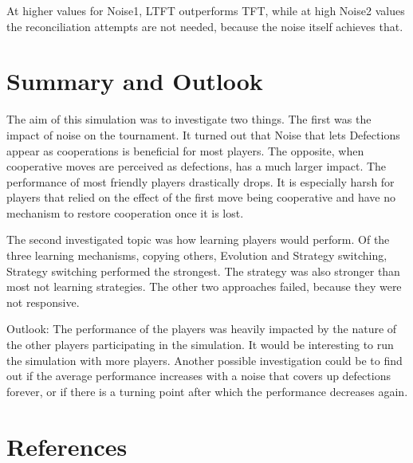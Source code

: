 \documentclass[11pt,twoside]{article}
\begin{document}
At higher values for Noise1, LTFT outperforms TFT, while at high Noise2 values the reconciliation attempts are not needed, because the noise itself achieves that.





\section{Summary and Outlook}
The aim of this simulation was to investigate two things. The first was the impact of noise on the tournament. It turned out that Noise that lets Defections appear as cooperations is beneficial for most players. The opposite, when cooperative moves are perceived as defections, has a much larger impact. The performance of most friendly players drastically drops. It is especially harsh for players that relied on the effect of the first move being cooperative and have no mechanism to restore cooperation once it is lost.

The second investigated topic was how learning players would perform. Of the three learning mechanisms, copying others, Evolution and Strategy switching, Strategy switching performed the strongest. The strategy was also stronger than most not learning strategies. The other two approaches failed, because they were not responsive.

Outlook: The performance of the players was heavily impacted by the nature of the other players participating in the simulation. It would be interesting to run the simulation with more players. Another possible investigation could be to find out if the average performance increases with a noise that covers up defections forever, or if there is a turning point after which the performance decreases again.

\section{References}
\end{document}
